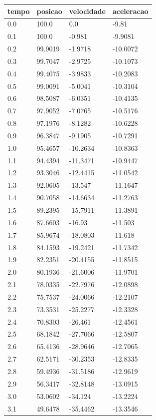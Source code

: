 \begin{tabular}{llll}
\toprule
tempo & posicao & velocidade & aceleracao \\
\midrule
0.0 & 100.0 & 0.0 & -9.81 \\
0.1 & 100.0 & -0.981 & -9.9081 \\
0.2 & 99.9019 & -1.9718 & -10.0072 \\
0.3 & 99.7047 & -2.9725 & -10.1073 \\
0.4 & 99.4075 & -3.9833 & -10.2083 \\
0.5 & 99.0091 & -5.0041 & -10.3104 \\
0.6 & 98.5087 & -6.0351 & -10.4135 \\
0.7 & 97.9052 & -7.0765 & -10.5176 \\
0.8 & 97.1976 & -8.1282 & -10.6228 \\
0.9 & 96.3847 & -9.1905 & -10.7291 \\
1.0 & 95.4657 & -10.2634 & -10.8363 \\
1.1 & 94.4394 & -11.3471 & -10.9447 \\
1.2 & 93.3046 & -12.4415 & -11.0542 \\
1.3 & 92.0605 & -13.547 & -11.1647 \\
1.4 & 90.7058 & -14.6634 & -11.2763 \\
1.5 & 89.2395 & -15.7911 & -11.3891 \\
1.6 & 87.6603 & -16.93 & -11.503 \\
1.7 & 85.9674 & -18.0803 & -11.618 \\
1.8 & 84.1593 & -19.2421 & -11.7342 \\
1.9 & 82.2351 & -20.4155 & -11.8515 \\
2.0 & 80.1936 & -21.6006 & -11.9701 \\
2.1 & 78.0335 & -22.7976 & -12.0898 \\
2.2 & 75.7537 & -24.0066 & -12.2107 \\
2.3 & 73.3531 & -25.2277 & -12.3328 \\
2.4 & 70.8303 & -26.461 & -12.4561 \\
2.5 & 68.1842 & -27.7066 & -12.5807 \\
2.6 & 65.4136 & -28.9646 & -12.7065 \\
2.7 & 62.5171 & -30.2353 & -12.8335 \\
2.8 & 59.4936 & -31.5186 & -12.9619 \\
2.9 & 56.3417 & -32.8148 & -13.0915 \\
3.0 & 53.0602 & -34.124 & -13.2224 \\
3.1 & 49.6478 & -35.4462 & -13.3546 \\

\end{tabular}
